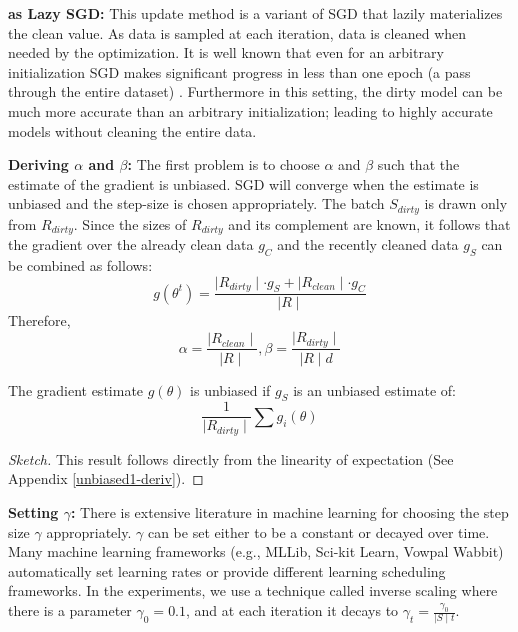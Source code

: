 \vspace{0.25em}

\noindent\textbf{ \sys as Lazy SGD: } This update method is a variant of SGD that lazily materializes the clean value.
As data is sampled at each iteration, data is cleaned when needed by the optimization.
It is well known that even for an arbitrary initialization SGD makes significant progress in less than one epoch (a pass through the entire dataset) \cite{bottou2012stochastic}.
Furthermore in this setting, the dirty model can be much more accurate than an arbitrary initialization; leading to highly accurate models without cleaning the entire data.

\vspace{0.25em}

\noindent\textbf{Deriving $\alpha$ and $\beta$: } The first problem is to choose $\alpha$ and $\beta$ such that the estimate of the gradient is unbiased. 
SGD will converge when the estimate is unbiased and the step-size is chosen appropriately.
The batch $S_{dirty}$ is drawn only from $R_{dirty}$.
Since the sizes of $R_{dirty}$ and its complement are known, it follows that the gradient over the already clean data $g_C$ and the recently cleaned data $g_S$ can be combined as follows:
\[
g(\theta^{t}) = \frac{\mid R_{dirty} \mid \cdot g_S + \mid R_{clean} \mid \cdot g_C  }{\mid R \mid}
\]
Therefore,
\[
\alpha = \frac{\mid R_{clean} \mid}{\mid R \mid}, \beta = \frac{\mid R_{dirty} \mid}{\mid R \mid d}
\]

\begin{lemma}\label{unbiased1}
The gradient estimate $g(\theta)$ is unbiased if $g_S$ is an unbiased estimate of:
\[
\frac{1}{\mid R_{dirty} \mid} \sum g_i(\theta)
\]
\end{lemma}
\begin{proof}[Sketch]
This result follows directly from the linearity of expectation (See Appendix \ref{unbiased1-deriv}).
\end{proof}

\vspace{0.25em}

\noindent\textbf{ Setting $\gamma$: } There is extensive literature in machine learning for choosing the step size $\gamma$ appropriately. $\gamma$ can be set either to be a constant or decayed over time. Many machine learning frameworks (e.g., MLLib, Sci-kit Learn, Vowpal Wabbit) automatically set learning rates or provide different learning scheduling frameworks. 
In the experiments, we use a technique called inverse scaling where there is a parameter $\gamma_0=0.1$, and at each iteration it decays to $\gamma_t = \frac{\gamma_0}{\mid S \mid t}$. 

